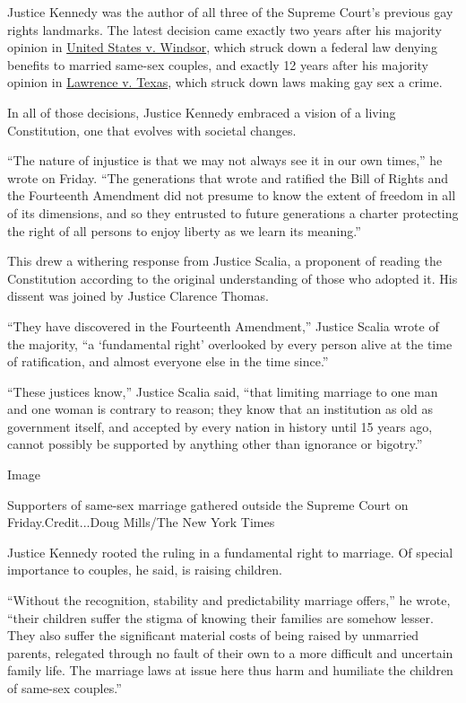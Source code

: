 Justice Kennedy was the author of all three of the Supreme Court's
previous gay rights landmarks. The latest decision came exactly two
years after his majority opinion in
\href{https://www.law.cornell.edu/supremecourt/text/12-307}{United
States v. Windsor}, which struck down a federal law denying benefits to
married same-sex couples, and exactly 12 years after his majority
opinion in
\href{https://www.law.cornell.edu/supct/html/02-102.ZO.html}{Lawrence v.
Texas}, which struck down laws making gay sex a crime.

In all of those decisions, Justice Kennedy embraced a vision of a living
Constitution, one that evolves with societal changes.

``The nature of injustice is that we may not always see it in our own
times,'' he wrote on Friday. ``The generations that wrote and ratified
the Bill of Rights and the Fourteenth Amendment did not presume to know
the extent of freedom in all of its dimensions, and so they entrusted to
future generations a charter protecting the right of all persons to
enjoy liberty as we learn its meaning.''

This drew a withering response from Justice Scalia, a proponent of
reading the Constitution according to the original understanding of
those who adopted it. His dissent was joined by Justice Clarence Thomas.

``They have discovered in the Fourteenth Amendment,'' Justice Scalia
wrote of the majority, ``a `fundamental right' overlooked by every
person alive at the time of ratification, and almost everyone else in
the time since.''

``These justices know,'' Justice Scalia said, ``that limiting marriage
to one man and one woman is contrary to reason; they know that an
institution as old as government itself, and accepted by every nation in
history until 15 years ago, cannot possibly be supported by anything
other than ignorance or bigotry.''

Image

Supporters of same-sex marriage gathered outside the Supreme Court on
Friday.Credit...Doug Mills/The New York Times

Justice Kennedy rooted the ruling in a fundamental right to marriage. Of
special importance to couples, he said, is raising children.

``Without the recognition, stability and predictability marriage
offers,'' he wrote, ``their children suffer the stigma of knowing their
families are somehow lesser. They also suffer the significant material
costs of being raised by unmarried parents, relegated through no fault
of their own to a more difficult and uncertain family life. The marriage
laws at issue here thus harm and humiliate the children of same-sex
couples.''

